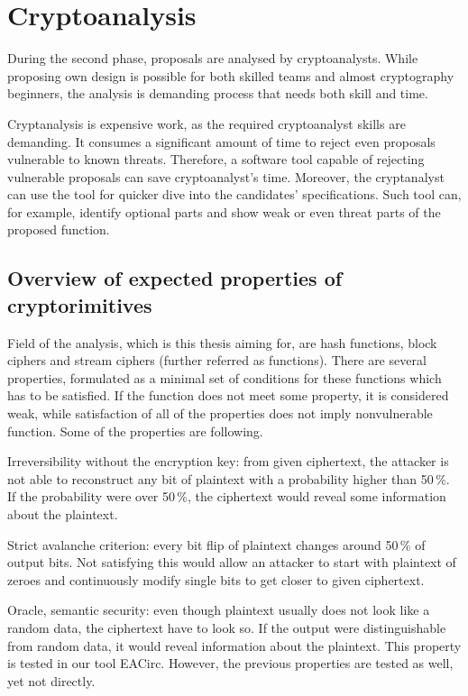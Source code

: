\documentclass[
  print, %
  Table,   %
  nolof,     %
  nolot,     %
  11pt, %
  oneside  %
]{fithesis3}
\begin{document}
\section{Cryptoanalysis}
\label{sec:cryptoanalysis}

During the second phase, proposals are analysed by cryptoanalysts. While proposing own design is possible for both skilled teams and almost cryptography beginners, the analysis is demanding process that needs both skill and time.

Cryptanalysis is expensive work, as the required cryptoanalyst skills are demanding. It consumes a significant amount of time to reject even proposals vulnerable to known threats. Therefore, a software tool capable of rejecting vulnerable proposals can save cryptoanalyst's time. Moreover, the cryptanalyst can use the tool for quicker dive into the candidates' specifications. Such tool can, for example, identify optional parts and show weak or even threat parts of the proposed function.

\subsection[Cryptorimitives properties]{Overview of expected properties of cryptorimitives}
\label{subsec:crypto-prop}

Field of the analysis, which is this thesis aiming for, are hash functions, block ciphers and stream ciphers (further referred as functions). There are several properties, formulated as a minimal set of conditions for these functions which has to be satisfied. If the function does not meet some property, it is considered weak, while satisfaction of all of the properties does not imply nonvulnerable function. Some of the properties are following.

Irreversibility without the encryption key: from given ciphertext, the attacker is not able to reconstruct any bit of plaintext with a probability higher than 50\,\%. If the probability were over 50\,\%, the ciphertext would reveal some information about the plaintext.

Strict avalanche criterion: every bit flip of plaintext changes around 50\,\% of output bits. Not satisfying this would allow an attacker to start with plaintext of zeroes and continuously modify single bits to get closer to given ciphertext.

Oracle, semantic security: even though plaintext usually does not look like a random data, the ciphertext have to look so. If the output were distinguishable from random data, it would reveal information about the plaintext. This property is tested in our tool EACirc. However, the previous properties are tested as well, yet not directly.
\end{document}
